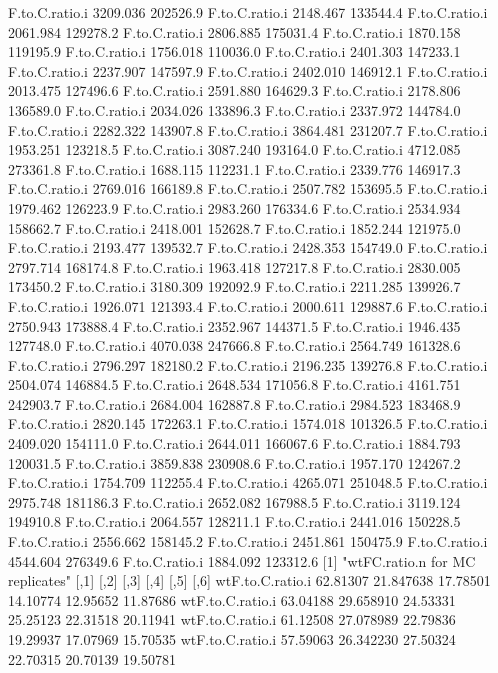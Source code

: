 \documentclass[11pt]{article} %
\begin{document}
\begin{Schunk}
\begin{Soutput}
F.to.C.ratio.i 3209.036 202526.9
F.to.C.ratio.i 2148.467 133544.4
F.to.C.ratio.i 2061.984 129278.2
F.to.C.ratio.i 2806.885 175031.4
F.to.C.ratio.i 1870.158 119195.9
F.to.C.ratio.i 1756.018 110036.0
F.to.C.ratio.i 2401.303 147233.1
F.to.C.ratio.i 2237.907 147597.9
F.to.C.ratio.i 2402.010 146912.1
F.to.C.ratio.i 2013.475 127496.6
F.to.C.ratio.i 2591.880 164629.3
F.to.C.ratio.i 2178.806 136589.0
F.to.C.ratio.i 2034.026 133896.3
F.to.C.ratio.i 2337.972 144784.0
F.to.C.ratio.i 2282.322 143907.8
F.to.C.ratio.i 3864.481 231207.7
F.to.C.ratio.i 1953.251 123218.5
F.to.C.ratio.i 3087.240 193164.0
F.to.C.ratio.i 4712.085 273361.8
F.to.C.ratio.i 1688.115 112231.1
F.to.C.ratio.i 2339.776 146917.3
F.to.C.ratio.i 2769.016 166189.8
F.to.C.ratio.i 2507.782 153695.5
F.to.C.ratio.i 1979.462 126223.9
F.to.C.ratio.i 2983.260 176334.6
F.to.C.ratio.i 2534.934 158662.7
F.to.C.ratio.i 2418.001 152628.7
F.to.C.ratio.i 1852.244 121975.0
F.to.C.ratio.i 2193.477 139532.7
F.to.C.ratio.i 2428.353 154749.0
F.to.C.ratio.i 2797.714 168174.8
F.to.C.ratio.i 1963.418 127217.8
F.to.C.ratio.i 2830.005 173450.2
F.to.C.ratio.i 3180.309 192092.9
F.to.C.ratio.i 2211.285 139926.7
F.to.C.ratio.i 1926.071 121393.4
F.to.C.ratio.i 2000.611 129887.6
F.to.C.ratio.i 2750.943 173888.4
F.to.C.ratio.i 2352.967 144371.5
F.to.C.ratio.i 1946.435 127748.0
F.to.C.ratio.i 4070.038 247666.8
F.to.C.ratio.i 2564.749 161328.6
F.to.C.ratio.i 2796.297 182180.2
F.to.C.ratio.i 2196.235 139276.8
F.to.C.ratio.i 2504.074 146884.5
F.to.C.ratio.i 2648.534 171056.8
F.to.C.ratio.i 4161.751 242903.7
F.to.C.ratio.i 2684.004 162887.8
F.to.C.ratio.i 2984.523 183468.9
F.to.C.ratio.i 2820.145 172263.1
F.to.C.ratio.i 1574.018 101326.5
F.to.C.ratio.i 2409.020 154111.0
F.to.C.ratio.i 2644.011 166067.6
F.to.C.ratio.i 1884.793 120031.5
F.to.C.ratio.i 3859.838 230908.6
F.to.C.ratio.i 1957.170 124267.2
F.to.C.ratio.i 1754.709 112255.4
F.to.C.ratio.i 4265.071 251048.5
F.to.C.ratio.i 2975.748 181186.3
F.to.C.ratio.i 2652.082 167988.5
F.to.C.ratio.i 3119.124 194910.8
F.to.C.ratio.i 2064.557 128211.1
F.to.C.ratio.i 2441.016 150228.5
F.to.C.ratio.i 2556.662 158145.2
F.to.C.ratio.i 2451.861 150475.9
F.to.C.ratio.i 4544.604 276349.6
F.to.C.ratio.i 1884.092 123312.6
[1] "wtFC.ratio.n  for MC replicates"
                      [,1]      [,2]     [,3]     [,4]     [,5]     [,6]
wtF.to.C.ratio.i  62.81307 21.847638 17.78501 14.10774 12.95652 11.87686
wtF.to.C.ratio.i  63.04188 29.658910 24.53331 25.25123 22.31518 20.11941
wtF.to.C.ratio.i  61.12508 27.078989 22.79836 19.29937 17.07969 15.70535
wtF.to.C.ratio.i  57.59063 26.342230 27.50324 22.70315 20.70139 19.50781

\end{Soutput}
\end{Schunk}
\end{document}
